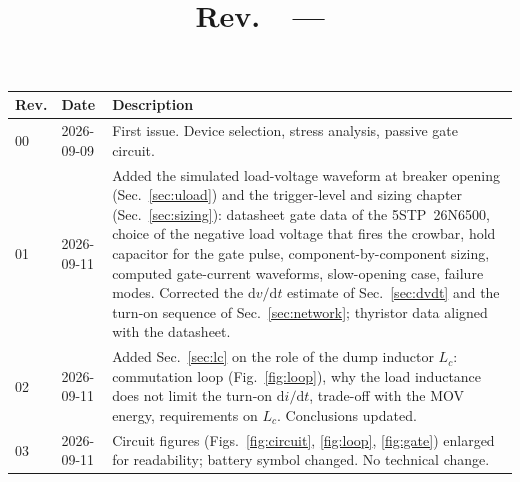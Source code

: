 \documentclass[11pt,a4paper]{article}
\title{\textbf{\doctitle}\\[6pt]\large \docsubtitle\\[10pt]\normalsize Rev.~\docrev\ --- \docdate}
\author{}
\date{}
\begin{document}
\maketitle
\thispagestyle{fancy}

\begin{center}
\begin{tabular}{@{}llp{9.5cm}@{}}
\toprule
\textbf{Rev.} & \textbf{Date} & \textbf{Description} \\
\midrule
00 & 2026-09-09 & First issue. Device selection, stress analysis, passive gate circuit. \\
01 & 2026-09-11 & Added the simulated load-voltage waveform at breaker opening
   (Sec.~\ref{sec:uload}) and the trigger-level and sizing chapter
   (Sec.~\ref{sec:sizing}): datasheet gate data of the 5STP~26N6500, choice of the
   negative load voltage that fires the crowbar, hold capacitor for the gate pulse,
   component-by-component sizing, computed gate-current waveforms, slow-opening case,
   failure modes. Corrected the $\mathrm{d}v/\mathrm{d}t$ estimate of
   Sec.~\ref{sec:dvdt} and the turn-on sequence of Sec.~\ref{sec:network}; thyristor
   data aligned with the datasheet. \\
02 & 2026-09-11 & Added Sec.~\ref{sec:lc} on the role of the dump inductor $L_c$:
   commutation loop (Fig.~\ref{fig:loop}), why the load inductance does not limit the
   turn-on $\mathrm{d}i/\mathrm{d}t$, trade-off with the MOV energy, requirements on
   $L_c$. Conclusions updated. \\
03 & 2026-09-11 & Circuit figures (Figs.~\ref{fig:circuit}, \ref{fig:loop}, \ref{fig:gate})
   enlarged for readability; battery symbol changed. No technical change. \\
\bottomrule
\end{tabular}
\end{center}
\end{document}
